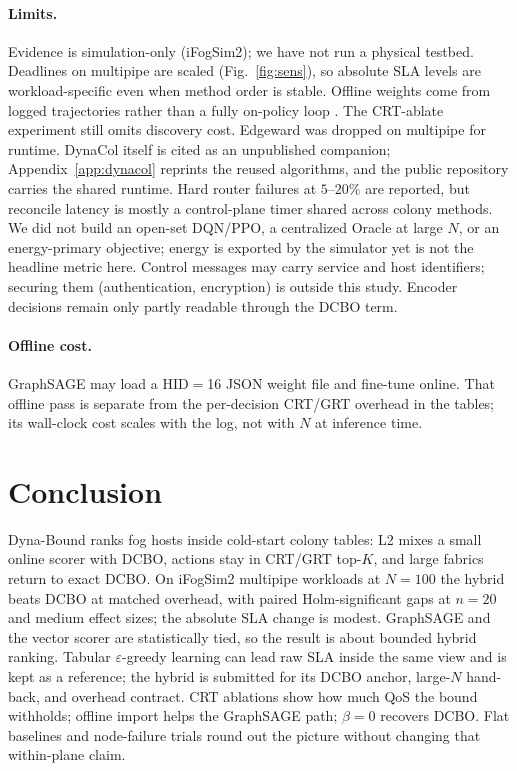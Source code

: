 \documentclass[11pt,a4paper]{article}
\begin{document}
\paragraph{Limits.}
\label{sec:limits}
Evidence is simulation-only (iFogSim2); we have not run a physical testbed.
Deadlines on multipipe are scaled (Fig.~\ref{fig:sens}), so absolute SLA levels
are workload-specific even when method order is stable. Offline weights come
from logged trajectories rather than a fully on-policy loop
\cite{levine_offline_rl2020}. The CRT-ablate experiment still omits discovery
cost. Edgeward was dropped on multipipe for runtime. DynaCol itself is cited as
an unpublished companion; Appendix~\ref{app:dynacol} reprints the reused
algorithms, and the public repository carries the shared runtime. Hard router
failures at $5$--$20\%$ are reported, but reconcile latency is mostly a
control-plane timer shared across colony methods. We did not build an open-set
DQN/PPO, a centralized Oracle at large $N$, or an energy-primary objective;
energy is exported by the simulator yet is not the headline metric here.
Control messages may carry service and host identifiers; securing them
(authentication, encryption) is outside this study. Encoder decisions remain
only partly readable through the DCBO term.

\paragraph{Offline cost.}
GraphSAGE may load a HID$=$16 JSON weight file and fine-tune online. That
offline pass is separate from the per-decision CRT/GRT overhead in the tables;
its wall-clock cost scales with the log, not with $N$ at inference time.

\section{Conclusion}
\label{sec:conc}

Dyna-Bound ranks fog hosts inside cold-start colony tables: L2 mixes a small
online scorer with DCBO, actions stay in CRT/GRT top-$K$, and large fabrics
return to exact DCBO. On iFogSim2 multipipe workloads at $N{=}100$ the hybrid
beats DCBO at matched overhead, with paired Holm-significant gaps at $n{=}20$
and medium effect sizes; the absolute SLA change is modest. GraphSAGE and the
vector scorer are statistically tied, so the result is about bounded hybrid
ranking. Tabular $\varepsilon$-greedy learning can lead raw SLA inside the same
view and is kept as a reference; the hybrid is submitted for its DCBO anchor,
large-$N$ hand-back, and overhead contract. CRT ablations show how much QoS the
bound withholds; offline import helps the GraphSAGE path; $\beta{=}0$ recovers
DCBO. Flat baselines and node-failure trials round out the picture without
changing that within-plane claim.
\end{document}
